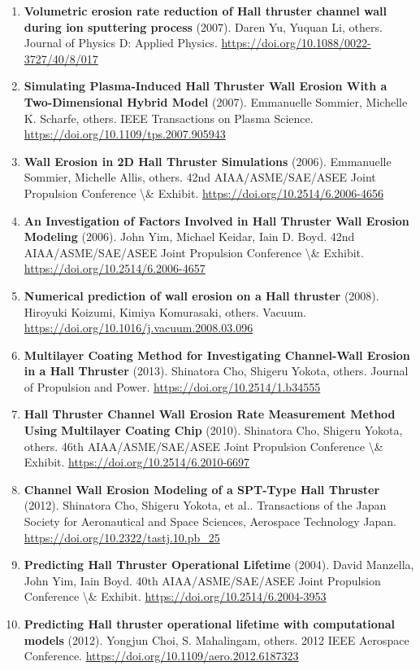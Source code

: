 \documentclass[11pt,a4paper]{article}
\begin{document}
\begin{enumerate}[leftmargin=1.4em]
\item \textbf{Volumetric erosion rate reduction of Hall thruster channel wall during ion sputtering process} (2007). Daren Yu, Yuquan Li, others. Journal of Physics D: Applied Physics. \url{https://doi.org/10.1088/0022-3727/40/8/017}
\item \textbf{Simulating Plasma-Induced Hall Thruster Wall Erosion With a Two-Dimensional Hybrid Model} (2007). Emmanuelle Sommier, Michelle K. Scharfe, others. IEEE Transactions on Plasma Science. \url{https://doi.org/10.1109/tps.2007.905943}
\item \textbf{Wall Erosion in 2D Hall Thruster Simulations} (2006). Emmanuelle Sommier, Michelle Allis, others. 42nd AIAA/ASME/SAE/ASEE Joint Propulsion Conference \textbackslash{}\& Exhibit. \url{https://doi.org/10.2514/6.2006-4656}
\item \textbf{An Investigation of Factors Involved in Hall Thruster Wall Erosion Modeling} (2006). John Yim, Michael Keidar, Iain D. Boyd. 42nd AIAA/ASME/SAE/ASEE Joint Propulsion Conference \textbackslash{}\& Exhibit. \url{https://doi.org/10.2514/6.2006-4657}
\item \textbf{Numerical prediction of wall erosion on a Hall thruster} (2008). Hiroyuki Koizumi, Kimiya Komurasaki, others. Vacuum. \url{https://doi.org/10.1016/j.vacuum.2008.03.096}
\item \textbf{Multilayer Coating Method for Investigating Channel-Wall Erosion in a Hall Thruster} (2013). Shinatora Cho, Shigeru Yokota, others. Journal of Propulsion and Power. \url{https://doi.org/10.2514/1.b34555}
\item \textbf{Hall Thruster Channel Wall Erosion Rate Measurement Method Using Multilayer Coating Chip} (2010). Shinatora Cho, Shigeru Yokota, others. 46th AIAA/ASME/SAE/ASEE Joint Propulsion Conference \textbackslash{}\& Exhibit. \url{https://doi.org/10.2514/6.2010-6697}
\item \textbf{Channel Wall Erosion Modeling of a SPT-Type Hall Thruster} (2012). Shinatora Cho, Shigeru Yokota, et al.. Transactions of the Japan Society for Aeronautical and Space Sciences, Aerospace Technology Japan. \url{https://doi.org/10.2322/tastj.10.pb_25}
\item \textbf{Predicting Hall Thruster Operational Lifetime} (2004). David Manzella, John Yim, Iain Boyd. 40th AIAA/ASME/SAE/ASEE Joint Propulsion Conference \textbackslash{}\& Exhibit. \url{https://doi.org/10.2514/6.2004-3953}
\item \textbf{Predicting Hall thruster operational lifetime with computational models} (2012). Yongjun Choi, S. Mahalingam, others. 2012 IEEE Aerospace Conference. \url{https://doi.org/10.1109/aero.2012.6187323}

\end{enumerate}
\end{document}
